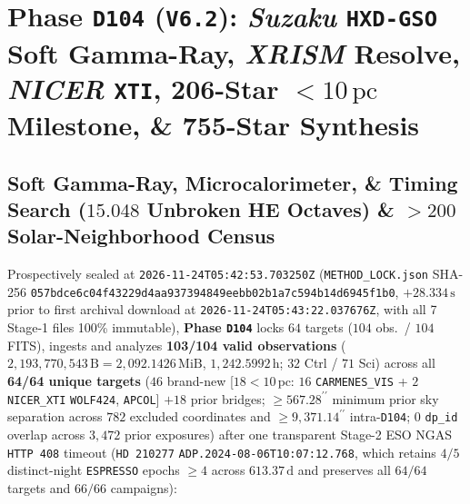\documentclass[twocolumn,10pt]{article}
\begin{document}
\section{Phase \texttt{D104} (\texttt{V6.2}): \textit{Suzaku} \texttt{HXD-GSO} Soft Gamma-Ray, \textit{XRISM} Resolve, \textit{NICER} \texttt{XTI}, 206-Star $<10\,\text{pc}$ Milestone, \& 755-Star Synthesis}
\subsection{Soft Gamma-Ray, Microcalorimeter, \& Timing Search ($15.048$ Unbroken HE Octaves) \& $>200$ Solar-Neighborhood Census}
Prospectively sealed at \texttt{2026-11-24T05:42:53.703250Z} (\texttt{METHOD\_LOCK.json} SHA-256 \texttt{057bdce6\allowbreak c04f4322\allowbreak 9d4aa937\allowbreak 394849ee\allowbreak bb02b1a7\allowbreak c594b14d\allowbreak 6945f1b0}, $+28.334\,\text{s}$ prior to first archival download at \texttt{2026-11-24T05:43:22.037676Z}, with all 7 Stage-1 files 100\% immutable), \textbf{Phase \texttt{D104}} locks $64$ targets ($104$ obs.\ / $104$ FITS), ingests and analyzes \textbf{103/104 valid observations} ($2{,}193{,}770{,}543\,\text{B} = 2{,}092.1426\,\text{MiB}$, $1{,}242.5992\,\text{h}$; $32$ Ctrl / $71$ Sci) across all \textbf{64/64 unique targets} ($46$ brand-new [$18 < 10\,\text{pc}$: $16$ \texttt{CARMENES\_VIS} + $2$ \texttt{NICER\_XTI} \texttt{WOLF424}, \texttt{APCOL}] $+ 18$ prior bridges; $\ge 567.28^{\prime\prime}$ minimum prior sky separation across $782$ excluded coordinates and $\ge 9{,}371.14^{\prime\prime}$ intra-\texttt{D104}; $0$ \texttt{dp\_id} overlap across $3{,}472$ prior exposures) after one transparent Stage-2 ESO NGAS \texttt{HTTP~408} timeout (\texttt{HD\,210277} \texttt{ADP.2024-08-06T10:07:12.768}, which retains $4/5$ distinct-night \texttt{ESPRESSO} epochs $\ge 4$ across $613.37\,\text{d}$ and preserves all $64/64$ targets and $66/66$ campaigns):
\end{document}
